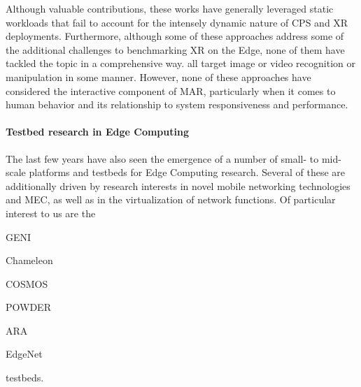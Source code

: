 Although valuable contributions, these works have generally leveraged static workloads that fail to account for the intensely dynamic nature of \gls{CPS} and \gls{XR} deployments.
Furthermore, although some of these approaches address some of the additional challenges to benchmarking \gls{XR} on the Edge, none of them have tackled the topic in a comprehensive way.\@
\cite{das2018edgebench,mcchesney2019defog,baurle2022comb,george2020openrtist} all target image or video recognition or manipulation in some manner.
However, none of these approaches have considered the interactive component of \gls{MAR}, particularly when it comes to human behavior and its relationship to system responsiveness and performance.

\paragraph{Testbed research in Edge Computing} The last few years have also seen the emergence of a number of small- to mid-scale platforms and testbeds for Edge Computing research.
Several of these are additionally driven by research interests in novel mobile networking technologies and \gls{MEC}, as well as in the virtualization of network functions.
Of particular interest to us are the
\begin{inlineenum}
    \item \acs{GENI}
    \item Chameleon
    \item \acs{COSMOS}
    \item \acs{POWDER}
    \item \acs{ARA}
    \item EdgeNet
\end{inlineenum} testbeds.

